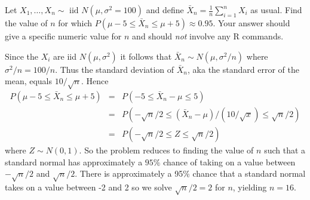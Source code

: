 \documentclass[addpoints,12pt]{exam}
\begin{document}
\begin{questions}

  \question[20] Let $X_1, \dots, X_n \sim \mbox{ iid } N(\mu, \sigma^2 = 100)$ and define $\bar{X}_n = \frac{1}{n} \sum_{i=1}^n X_i$ as usual.
Find the value of $n$ for which $P(\mu - 5 \leq \bar{X}_n \leq \mu + 5) \approx 0.95$.
Your answer should give a specific numeric value for $n$ and should \emph{not} involve any R commands.
\begin{solution}[2in]
  Since the $X_i$ are iid $N(\mu,\sigma^2)$ it follows that $\bar{X}_{n} \sim N(\mu, \sigma^2/n)$ where $\sigma^2/n = 100/n$.
  Thus the standard deviation of $\bar{X}_n$, aka the standard error of the mean, equals $10/\sqrt{n}$.
  Hence
  \begin{eqnarray*}
    P\left( \mu - 5 \leq \bar{X}_n \leq \mu + 5 \right) &=& 
    P\left( - 5 \leq \bar{X}_n - \mu \leq 5 \right) \\
    &=& P\left( -\sqrt{n}/2 \leq (\bar{X}_n - \mu)/(10 / \sqrt{x}) \leq \sqrt{n}/2 \right) \\
    &=& P\left( -\sqrt{n}/2 \leq Z \leq \sqrt{n}/2 \right) 
  \end{eqnarray*}
  where $Z \sim N(0,1)$.
  So the problem reduces to finding the value of $n$ such that a standard normal has approximately a $95\%$ chance of taking on a value between $-\sqrt{n}/2$ and $\sqrt{n}/2$.
  There is approximately a 95\% chance that a standard normal takes on a value between -2 and 2 so we solve $\sqrt{n}/2 = 2$ for $n$, yielding $n = 16$.
\end{solution}


\end{questions}
\end{document}
